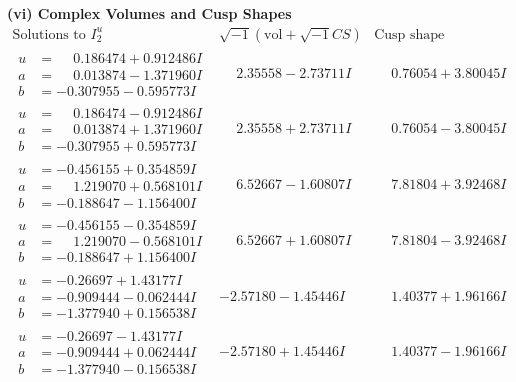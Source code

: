 \documentclass[1p]{elsarticle_modified}
\theoremstyle{definition}
\newcommand{\I}{\sqrt{-1}}
\begin{document}
\newpage\flushleft \textbf{(vi) Complex Volumes and Cusp Shapes}
$$\begin{array}{c|c|c}  
\text{Solutions to }I^u_{2}& \I (\text{vol} + \sqrt{-1}CS) & \text{Cusp shape}\\
 \hline 
\begin{aligned}
u &= \phantom{-}0.186474 + 0.912486 I \\
a &= \phantom{-}0.013874 - 1.371960 I \\
b &= -0.307955 - 0.595773 I\end{aligned}
 & \phantom{-}2.35558 - 2.73711 I & \phantom{-}0.76054 + 3.80045 I \\ \hline\begin{aligned}
u &= \phantom{-}0.186474 - 0.912486 I \\
a &= \phantom{-}0.013874 + 1.371960 I \\
b &= -0.307955 + 0.595773 I\end{aligned}
 & \phantom{-}2.35558 + 2.73711 I & \phantom{-}0.76054 - 3.80045 I \\ \hline\begin{aligned}
u &= -0.456155 + 0.354859 I \\
a &= \phantom{-}1.219070 + 0.568101 I \\
b &= -0.188647 - 1.156400 I\end{aligned}
 & \phantom{-}6.52667 - 1.60807 I & \phantom{-}7.81804 + 3.92468 I \\ \hline\begin{aligned}
u &= -0.456155 - 0.354859 I \\
a &= \phantom{-}1.219070 - 0.568101 I \\
b &= -0.188647 + 1.156400 I\end{aligned}
 & \phantom{-}6.52667 + 1.60807 I & \phantom{-}7.81804 - 3.92468 I \\ \hline\begin{aligned}
u &= -0.26697 + 1.43177 I \\
a &= -0.909444 - 0.062444 I \\
b &= -1.377940 + 0.156538 I\end{aligned}
 & -2.57180 - 1.45446 I & \phantom{-}1.40377 + 1.96166 I \\ \hline\begin{aligned}
u &= -0.26697 - 1.43177 I \\
a &= -0.909444 + 0.062444 I \\
b &= -1.377940 - 0.156538 I\end{aligned}
 & -2.57180 + 1.45446 I & \phantom{-}1.40377 - 1.96166 I \\ \hline\begin{aligned}

\end{aligned}
\end{array}$$
\end{document}
